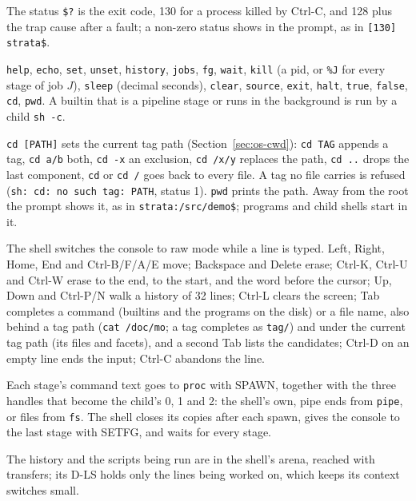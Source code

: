 The status \texttt{\$?} is the exit code, 130 for a process killed by Ctrl-C, and 128 plus the trap
cause after a fault; a non-zero status shows in the prompt, as in \texttt{[130] strata\$}.

\begin{description}[leftmargin=1em,style=nextline]
\item[Builtins] \texttt{help}, \texttt{echo}, \texttt{set}, \texttt{unset}, \texttt{history},
  \texttt{jobs}, \texttt{fg}, \texttt{wait}, \texttt{kill} (a pid, or \texttt{\%J} for every stage of job
  $J$), \texttt{sleep} (decimal seconds), \texttt{clear}, \texttt{source}, \texttt{exit}, \texttt{halt},
  \texttt{true}, \texttt{false}, \texttt{cd}, \texttt{pwd}. A builtin that is a pipeline stage or runs
  in the background is run by a child \texttt{sh -c}.
\item[cd and pwd] \texttt{cd [PATH]} sets the current tag path (Section~\ref{sec:os-cwd}):
  \texttt{cd TAG} appends a tag, \texttt{cd a/b} both, \texttt{cd -x} an exclusion, \texttt{cd /x/y}
  replaces the path, \texttt{cd ..} drops the last component, \texttt{cd} or \texttt{cd /} goes back to
  every file. A tag no file carries is refused (\texttt{sh: cd: no such tag: PATH}, status 1).
  \texttt{pwd} prints the path. Away from the root the prompt shows it, as in
  \texttt{strata:/src/demo\$}; programs and child shells start in it.
\item[Line editing] The shell switches the console to raw mode while a line is typed. Left, Right,
  Home, End and Ctrl-B/F/A/E move; Backspace and Delete erase; Ctrl-K, Ctrl-U and Ctrl-W erase to the
  end, to the start, and the word before the cursor; Up, Down and Ctrl-P/N walk a history of 32 lines;
  Ctrl-L clears the screen; Tab completes a command (builtins and the programs on the disk) or a file
  name, also behind a tag path (\texttt{cat /doc/mo}; a tag completes as \texttt{tag/}) and under the
  current tag path (its files and facets), and a second Tab lists the candidates; Ctrl-D on an empty line ends the input; Ctrl-C abandons
  the line.
\item[Running a command] Each stage's command text goes to \texttt{proc} with SPAWN, together with the
  three handles that become the child's 0, 1 and 2: the shell's own, pipe ends from \texttt{pipe}, or
  files from \texttt{fs}. The shell closes its copies after each spawn, gives the console to the last
  stage with SETFG, and waits for every stage.
\item[Where its state lives] The history and the scripts being run are in the shell's arena, reached
  with transfers; its D-LS holds only the lines being worked on, which keeps its context switches
  small.
\end{description}

